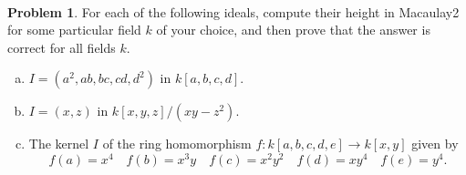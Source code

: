 \documentclass[11pt]{article}
\theoremstyle{definition}
\newtheorem{problem}{Problem}
\begin{document}
\

\begin{problem}
	For each of the following ideals, compute their height in Macaulay2 for some particular field $k$ of your choice, and then prove that the answer is correct for all fields $k$.

\begin{enumerate}[a)]
\item $I = (a^2,ab,bc,cd,d^2)$ in $k[a,b,c,d]$.
\item $I = (x,z)$ in $k[x,y,z]/(xy-z^2)$.
\item The kernel $I$ of the ring homomorphism $f\!: k[a,b,c,d,e] \to k[x,y]$ given by
$$f(a) = x^4 \quad f(b) = x^3y \quad f(c) = x^2y^2 \quad f(d) = xy^4 \quad f(e) = y^4.$$
\end{enumerate}

\end{problem}
\end{document}
